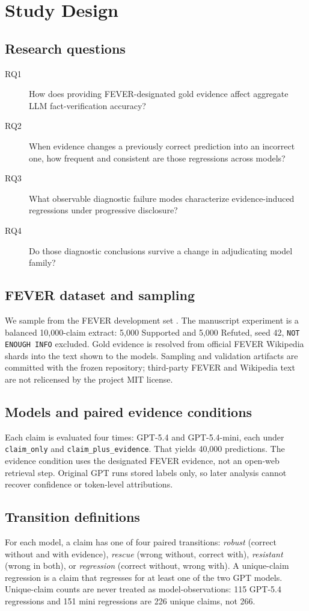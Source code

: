 \section{Study Design}
\label{sec:design}

\subsection{Research questions}
\label{sec:rqs}
\begin{description}
\item[RQ1] How does providing FEVER-designated gold evidence affect aggregate LLM fact-verification accuracy?
\item[RQ2] When evidence changes a previously correct prediction into an incorrect one, how frequent and consistent are those regressions across models?
\item[RQ3] What observable diagnostic failure modes characterize evidence-induced regressions under progressive disclosure?
\item[RQ4] Do those diagnostic conclusions survive a change in adjudicating model family?
\end{description}

\subsection{FEVER dataset and sampling}
We sample from the FEVER development set \citep{thorne-etal-2018-fever}.
The manuscript experiment is a balanced 10{,}000-claim extract: 5{,}000 Supported and 5{,}000 Refuted, seed 42, \texttt{NOT ENOUGH INFO} excluded.
Gold evidence is resolved from official FEVER Wikipedia shards into the text shown to the models.
Sampling and validation artifacts are committed with the frozen repository; third-party FEVER and Wikipedia text are not relicensed by the project MIT license.

\subsection{Models and paired evidence conditions}
Each claim is evaluated four times: GPT-5.4 and GPT-5.4-mini, each under \texttt{claim\_only} and \texttt{claim\_plus\_evidence}.
That yields 40{,}000 predictions.
The evidence condition uses the designated FEVER evidence, not an open-web retrieval step.
Original GPT runs stored labels only, so later analysis cannot recover confidence or token-level attributions.

\subsection{Transition definitions}
For each model, a claim has one of four paired transitions:
\emph{robust} (correct without and with evidence),
\emph{rescue} (wrong without, correct with),
\emph{resistant} (wrong in both),
or \emph{regression} (correct without, wrong with).
A unique-claim regression is a claim that regresses for at least one of the two GPT models.
Unique-claim counts are never treated as model-observations: 115 GPT-5.4 regressions and 151 mini regressions are 226 unique claims, not 266.

